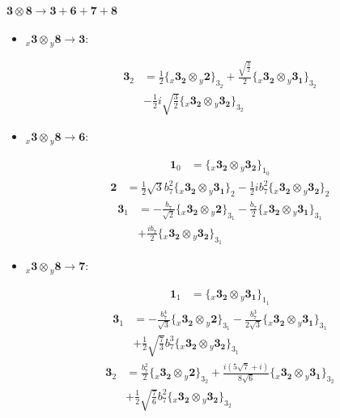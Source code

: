 \documentclass[english]{article}
\newcommand{\cgEqFontsize}{\large}
\newcommand{\rep}[1]{\mathbf{#1}}
\newcommand{\repx}[2]{{}_{#2}\mathbf{#1}}
\newcommand{\tsprod}[2]{\rep{#1}\otimes\rep{#2}}
\newcommand{\tsprodx}[2]{\repx{#1}{x}\otimes\repx{#2}{y}}
\newcommand{\subcgs}[3]{\big\{ \tsprodx{#1}{#2}\big\}^{}_{#3}}
\begin{document}
\paragraph*{\cgEqFontsize $\tsprod{3}{8}\to\rep{3}+\rep{6}+\rep{7}+\rep{8}$}
\begin{itemize}
\item $\tsprodx{3}{8}\to\rep{3}$:
\begin{fleqn}
\begin{align*}
\rep{3}_{2} & = \frac{1}{2}\subcgs{3_{2}}{2}{3_{2}}+\frac{\sqrt{\frac{3}{2}}}{2}\subcgs{3_{2}}{3_{1}}{3_{2}} \\ 
 & -\frac{1}{2} i \sqrt{\frac{3}{2}}\subcgs{3_{2}}{3_{2}}{3_{2}}
\end{align*}
\end{fleqn}
\item $\tsprodx{3}{8}\to\rep{6}$:
\begin{fleqn}
\begin{align*}
\rep{1}_{0} & = \subcgs{3_{2}}{3_{2}}{1_{0}}
\end{align*}
\begin{align*}
\rep{2} & = \frac{1}{2} \sqrt{3} b_7^2\subcgs{3_{2}}{3_{1}}{2}-\frac{1}{2} i b_7^2\subcgs{3_{2}}{3_{2}}{2}
\end{align*}
\begin{align*}
\rep{3}_{1} & = -\frac{b_7}{\sqrt{2}}\subcgs{3_{2}}{2}{3_{1}}-\frac{b_7}{2}\subcgs{3_{2}}{3_{1}}{3_{1}} \\ 
 & +\frac{i b_7}{2}\subcgs{3_{2}}{3_{2}}{3_{1}}
\end{align*}
\end{fleqn}
\item $\tsprodx{3}{8}\to\rep{7}$:
\begin{fleqn}
\begin{align*}
\rep{1}_{1} & = \subcgs{3_{2}}{3_{1}}{1_{1}}
\end{align*}
\begin{align*}
\rep{3}_{1} & = -\frac{b_7^4}{\sqrt{3}}\subcgs{3_{2}}{2}{3_{1}}-\frac{b_7^3}{2 \sqrt{3}}\subcgs{3_{2}}{3_{1}}{3_{1}} \\ 
 & +\frac{1}{2} \sqrt{\frac{7}{3}} b_7^3\subcgs{3_{2}}{3_{2}}{3_{1}}
\end{align*}
\begin{align*}
\rep{3}_{2} & = \frac{b_7^2}{2}\subcgs{3_{2}}{2}{3_{2}}+\frac{i \left(5 \sqrt{7}+i\right)}{8 \sqrt{6}}\subcgs{3_{2}}{3_{1}}{3_{2}} \\ 
 & +\frac{1}{2} \sqrt{\frac{7}{6}} b_7^2\subcgs{3_{2}}{3_{2}}{3_{2}}
\end{align*}

\end{fleqn}
\end{itemize}
\end{document}
